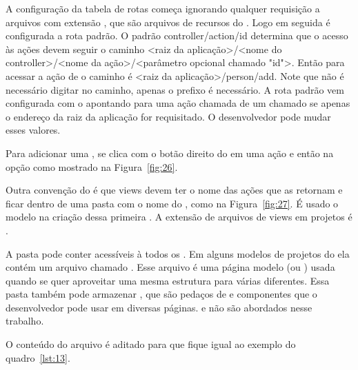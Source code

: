 
A configuração da tabela de rotas começa ignorando qualquer requisição a arquivos com extensão , que são arquivos de recursos do . Logo em seguida é configurada a rota padrão. O padrão {controller}/{action}/{id} determina que o acesso às ações devem seguir o caminho <raiz da aplicação>/<nome do controller>/<nome da ação>/<parâmetro opcional chamado "id">. Então para acessar a ação  de  o caminho é <raiz da aplicação>/person/add. Note que não é necessário digitar  no caminho, apenas o prefixo é necessário. A rota padrão vem configurada com o apontando para uma ação chamada  de um  chamado  se apenas o endereço da raiz da aplicação for requisitado. O desenvolvedor pode mudar esses valores. 

Para adicionar uma , se clica com o botão direito do  em uma ação e então na opção  como mostrado na Figura~\ref{fig:26}. 


Outra convenção do  é que views devem ter o nome das ações que as retornam e ficar dentro de uma pasta com o nome do , como na Figura~\ref{fig:27}. É usado o modelo  na criação dessa primeira . A extensão de arquivos de views em projetos  é .


A pasta  pode conter  acessíveis à todos os . Em alguns modelos de projetos do  ela contém um arquivo chamado . Esse arquivo é uma página modelo (ou ) usada quando se quer aproveitar uma mesma estrutura para várias  diferentes. Essa pasta também pode armazenar , que são pedaços de  e componentes que o desenvolvedor pode usar em diversas páginas.  e  não são abordados nesse trabalho.

O conteúdo do arquivo  é aditado para que fique igual ao exemplo do quadro~\ref{lst:13}.


